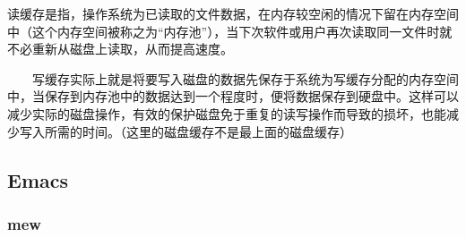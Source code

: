 \documentclass[11pt]{article}
\begin{document}
      读缓存是指，操作系统为已读取的文件数据，在内存较空闲的情况下留在内存空间中（这个内存空间被称之为“内存池”），当下次软件或用户再次读取同一文件时就不必重新从磁盘上读取，从而提高速度。

      　　写缓存实际上就是将要写入磁盘的数据先保存于系统为写缓存分配的内存空间中，当保存到内存池中的数据达到一个程度时，便将数据保存到硬盘中。这样可以减少实际的磁盘操作，有效的保护磁盘免于重复的读写操作而导致的损坏，也能减少写入所需的时间。（这里的磁盘缓存不是最上面的磁盘缓存）

\subsection{Emacs}
\label{sec-1.6}

\subsubsection{mew}
\label{sec-1.6.1}
\end{document}
